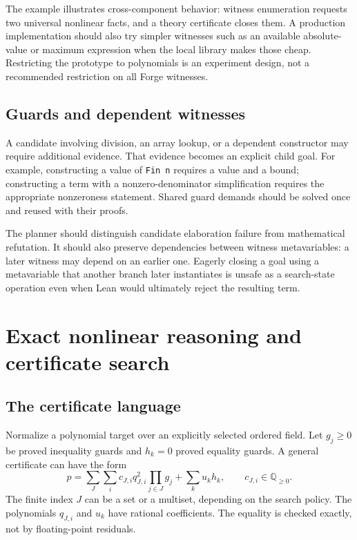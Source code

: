 \documentclass[11pt,a4paper]{article}
\newcommand{\code}[1]{\texttt{#1}}
\newcommand{\Q}{\mathbb Q}
\begin{document}
The example illustrates cross-component behavior: witness enumeration requests
two universal nonlinear facts, and a theory certificate closes them. A
production implementation should also try simpler witnesses such as an
available absolute-value or maximum expression when the local library makes
those cheap. Restricting the prototype to polynomials is an experiment design,
not a recommended restriction on all Forge witnesses.

\subsection{Guards and dependent witnesses}
A candidate involving division, an array lookup, or a dependent constructor
may require additional evidence. That evidence becomes an explicit child goal.
For example, constructing a value of \code{Fin n} requires a value and a bound;
constructing a term with a nonzero-denominator simplification requires the
appropriate nonzeroness statement. Shared guard demands should be solved once
and reused with their proofs.

The planner should distinguish candidate elaboration failure from mathematical
refutation. It should also preserve dependencies between witness metavariables:
a later witness may depend on an earlier one. Eagerly closing a goal using a
metavariable that another branch later instantiates is unsafe as a search-state
operation even when Lean would ultimately reject the resulting term.

\section{Exact nonlinear reasoning and certificate search}
\label{sec:nonlinear}

\subsection{The certificate language}
Normalize a polynomial target over an explicitly selected ordered field.
Let $g_j\ge0$ be proved inequality guards and $h_k=0$ proved equality guards.
A general certificate can have the form
\begin{equation}\label{eq:cone}
 p = \sum_{J}\sum_i c_{J,i}q_{J,i}^2\prod_{j\in J}g_j
       +\sum_k u_k h_k,
 \qquad c_{J,i}\in\Q_{\ge0}.
\end{equation}
The finite index $J$ can be a set or a multiset, depending on the search policy.
The polynomials $q_{J,i}$ and $u_k$ have rational coefficients. The equality is
checked exactly, not by floating-point residuals.
\end{document}
